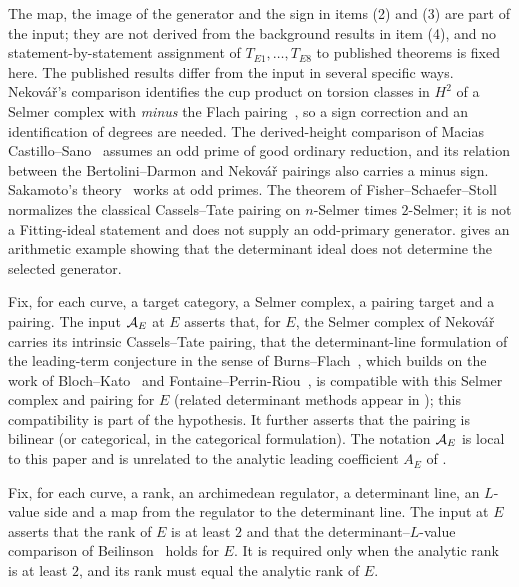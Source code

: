 The map, the image of the generator and the sign in items (2) and (3) are
part of the input; they are not derived from the background results in
item (4), and no statement-by-statement assignment of $T_{E1},\dots,T_{E8}$
to published theorems is fixed here.  The published results differ from
the input in several specific ways.  Nekov\'a\v{r}'s comparison
\citep[Proposition~10.8.7]{Nekovar2006} identifies the cup product on
torsion classes in $H^2$ of a Selmer complex with \emph{minus} the Flach
pairing~\citep{Flach1990}, so a sign correction and an identification of
degrees are needed.  The derived-height comparison of Macias
Castillo--Sano~\citep[Theorem~4.2]{MaciasCastilloSano2026} assumes an odd
prime of good ordinary reduction, and its relation between the
Bertolini--Darmon and Nekov\'a\v{r} pairings also carries a minus sign.
Sakamoto's theory~\citep{Sakamoto2018} works at odd primes.  The theorem of
Fisher--Schaefer--Stoll~\citep[Theorem~6.3]{FisherSchaeferStoll2010}
normalizes the classical Cassels--Tate pairing on $n$-Selmer times
$2$-Selmer; it is not a Fitting-ideal statement and does not supply an
odd-primary generator.   gives an arithmetic example
showing that the determinant ideal does not determine the selected
generator.

\begin{definition}\label{def:closure:a-e-import}
Fix, for each curve, a target category, a Selmer complex, a pairing
target and a pairing.  The input $\mathcal{A}_E$ at $E$ asserts that, for $E$,
the Selmer complex of Nekov\'a\v{r}~\citep{Nekovar2006} carries its
intrinsic Cassels--Tate pairing, that the determinant-line formulation of
the leading-term conjecture in the sense of
Burns--Flach~\citep{BurnsFlach2001}, which builds on the work of
Bloch--Kato~\citep{BlochKato1990} and
Fontaine--Perrin-Riou~\citep{FontainePerrinRiou1994}, is compatible with
this Selmer complex and pairing for $E$ (related determinant methods
appear in \citep{BurnsMaciasCastilloSeo2024,MaciasCastilloSano2026}); this
compatibility is part of the hypothesis.  It further asserts that the pairing is bilinear (or categorical, in the
categorical formulation).  The notation $\mathcal{A}_E$ is local to this paper and
is unrelated to the analytic leading coefficient $A_E$ of
\citet{TsiokosBSDApparatus2026}.
\end{definition}

\begin{definition}\label{def:closure:beilinson-import}
Fix, for each curve, a rank, an archimedean regulator, a determinant line,
an $L$-value side and a map from the regulator to the determinant line.
The input at $E$ asserts that the rank of $E$ is at least $2$ and that the
determinant--$L$-value comparison of Beilinson~\citep{Beilinson1985} holds
for $E$.  It is required only when the analytic rank is at least $2$, and
its rank must equal the analytic rank of $E$.
\end{definition}


